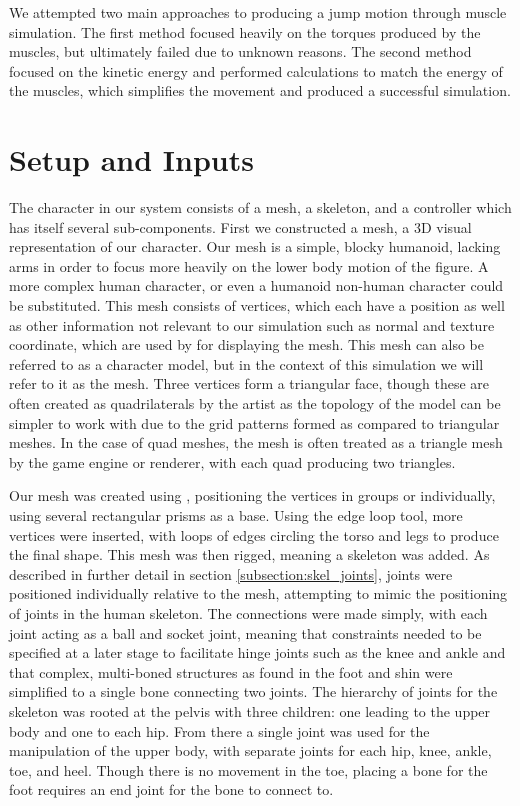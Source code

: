 We attempted two main approaches to producing a jump motion through muscle simulation.  The first method focused heavily on the torques produced by the muscles, but ultimately failed due to unknown reasons.  The second method focused on the kinetic energy and performed calculations to match the energy of the muscles, which simplifies the movement and produced a successful simulation.

\section{Setup and Inputs}
\label{section:setup_inputs}
The character in our system consists of a mesh, a skeleton, and a controller which has itself several sub-components.  First we constructed a mesh, a 3D visual representation of our character.  Our mesh is a simple, blocky humanoid, lacking arms in order to focus more heavily on the lower body motion of the figure.  A more complex human character, or even a humanoid non-human character could be substituted.  This mesh consists of vertices, which each have a position as well as other information not relevant to our simulation such as normal and texture coordinate, which are used by \unity{} for displaying the mesh.  This mesh can also be referred to as a character model, but in the context of this simulation we will refer to it as the mesh.  Three vertices form a triangular face, though these are often created as quadrilaterals by the artist as the topology of the model can be simpler to work with due to the grid patterns formed as compared to triangular meshes.  In the case of quad meshes, the mesh is often treated as a triangle mesh by the game engine or renderer, with each quad producing two triangles.

Our mesh was created using \maya{}, positioning the vertices in groups or individually, using several rectangular prisms as a base.  Using the edge loop tool, more vertices were inserted, with loops of edges circling the torso and legs to produce the final shape.  This mesh was then rigged, meaning a skeleton was added.  As described in further detail in section \ref{subsection:skel_joints}, joints were positioned individually relative to the mesh, attempting to mimic the positioning of joints in the human skeleton.  The connections were made simply, with each joint acting as a ball and socket joint, meaning that constraints needed to be specified at a later stage to facilitate hinge joints such as the knee and ankle and that complex, multi-boned structures as found in the foot and shin were simplified to a single bone connecting two joints.  The hierarchy of joints for the skeleton was rooted at the pelvis with three children: one leading to the upper body and one to each hip.  From there a single joint was used for the manipulation of the upper body, with separate joints for each hip, knee, ankle, toe, and heel.  Though there is no movement in the toe, placing a bone for the foot requires an end joint for the bone to connect to.

